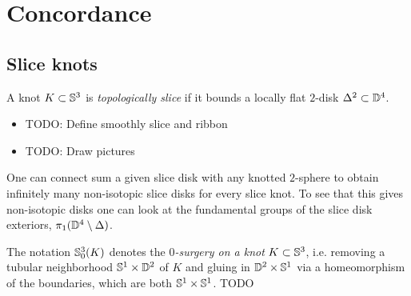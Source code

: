 \newpage
\section{Concordance}

\subsection{Slice knots}

\begin{definition}
	A knot $K \subset \mathbb{S}^{3}$ is
	\textit{topologically slice} 
	if it bounds a locally flat $2$-disk $\Delta^{2} \subset \mathbb{D}^{4}$.
\end{definition}

\begin{definition}
	\begin{itemize}
		\item TODO: Define smoothly slice and ribbon
		\item TODO: Draw pictures
	\end{itemize}
\end{definition}

\begin{observation}
	One can connect sum a given slice disk with any knotted
	$2$-sphere to obtain infinitely many non-isotopic
	slice disks for every slice knot.
	To see that this gives non-isotopic disks one can look
	at the fundamental groups of the slice disk exteriors,
	$\pi_{1}(\mathbb{D}^{4} \setminus \Delta)$.
\end{observation}


\begin{definition}
	The notation $\mathbb{S}^{3}_{0}(K)$ denotes the \textit{$0$-surgery on a knot}
	$K \subset \mathbb{S}^{3}$, i.e. removing a tubular neighborhood
	$\mathbb{S}^{1} \times \mathbb{D}^{2}$ of $K$ and gluing in $\mathbb{D}^{2} \times \mathbb{S}^{1}$
	via a homeomorphism of the boundaries, which are both $\mathbb{S}^{1} \times \mathbb{S}^{1}$.
	TODO %
\end{definition}

